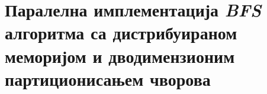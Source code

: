 \section{Паралелна имплементација \textit{BFS} алгоритма са дистрибуираном меморијом и дводимензионим партиционисањем чворова}
